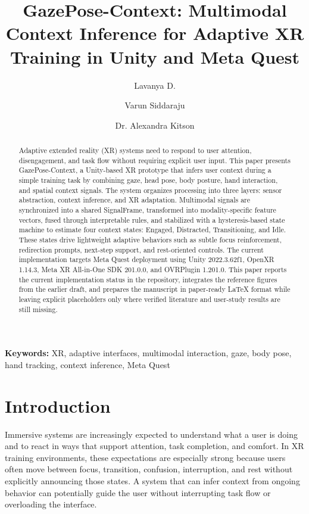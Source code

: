 \documentclass[10pt,twocolumn]{article}
\title{\textbf{GazePose-Context: Multimodal Context Inference for Adaptive XR Training in Unity and Meta Quest}}
\author{
  Lavanya D. \and Varun Siddaraju \and Dr. Alexandra Kitson
}
\date{}
\begin{document}
\maketitle

\begin{abstract}
Adaptive extended reality (XR) systems need to respond to user attention, disengagement, and task flow without requiring explicit user input. This paper presents GazePose-Context, a Unity-based XR prototype that infers user context during a simple training task by combining gaze, head pose, body posture, hand interaction, and spatial context signals. The system organizes processing into three layers: sensor abstraction, context inference, and XR adaptation. Multimodal signals are synchronized into a shared SignalFrame, transformed into modality-specific feature vectors, fused through interpretable rules, and stabilized with a hysteresis-based state machine to estimate four context states: Engaged, Distracted, Transitioning, and Idle. These states drive lightweight adaptive behaviors such as subtle focus reinforcement, redirection prompts, next-step support, and rest-oriented controls. The current implementation targets Meta Quest deployment using Unity 2022.3.62f1, OpenXR 1.14.3, Meta XR All-in-One SDK 201.0.0, and OVRPlugin 1.201.0. This paper reports the current implementation status in the repository, integrates the reference figures from the earlier draft, and prepares the manuscript in paper-ready LaTeX format while leaving explicit placeholders only where verified literature and user-study results are still missing.
\end{abstract}

\textbf{Keywords:} XR, adaptive interfaces, multimodal interaction, gaze, body pose, hand tracking, context inference, Meta Quest

\section{Introduction}
Immersive systems are increasingly expected to understand what a user is doing and to react in ways that support attention, task completion, and comfort. In XR training environments, these expectations are especially strong because users often move between focus, transition, confusion, interruption, and rest without explicitly announcing those states. A system that can infer context from ongoing behavior can potentially guide the user without interrupting task flow or overloading the interface.
\end{document}
